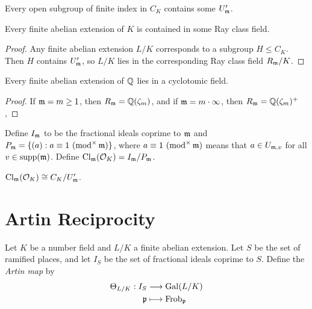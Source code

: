 \begin{lemma}
  Every open subgroup of finite index
  in $C_K$ contains some $U_{\mathfrak{m}}'$.
\end{lemma}

\begin{corollary}
  Every finite abelian extension of
  $K$ is contained in some Ray
  class field.
\end{corollary}

\begin{proof}
  Any finite abelian extension $L / K$
  corresponds to a subgroup $H \le C_K$.
  Then $H$ contains $U_{\mathfrak{m}}'$, so
  $L / K$ lies in the corresponding
  Ray class field $R_{\mathfrak{m}} / K$.
\end{proof}

\begin{corollary}
  Every finite abelian extension of $\mathbb{Q}$
  lies in a cyclotomic field.
\end{corollary}

\begin{proof}
  If $\mathfrak{m} = m \ge 1$, then
  $R_{\mathfrak{m}} = \mathbb{Q}(\zeta_m)$, and if
  $\mathfrak{m} = m \cdot \infty$, then
  $R_{\mathfrak{m}} = \mathbb{Q}(\zeta_m)^+$,
\end{proof}

\begin{definition}
  Define $I_{\mathfrak{m}}$ to be the fractional
  ideals coprime to $\mathfrak{m}$ and
  $P_{\mathfrak{m}} = \{(a) : a \equiv 1 \ ({\mathrm{mod}^\times}\, \mathfrak{m})\}$,
  where $a \equiv 1 \ ({\mathrm{mod}^\times}\, \mathfrak{m})$ means
  that $a \in U_{\mathfrak{m}, v}$ for all $v \in \operatorname{supp}(\mathfrak{m})$.
  Define $\operatorname{Cl}_{\mathfrak{m}}(\mathcal{O}_K) = I_{\mathfrak{m}} / P_{\mathfrak{m}}$.
\end{definition}

\begin{prop}
  $\operatorname{Cl}_{\mathfrak{m}}(\mathcal{O}_K) \cong C_K / U_{\mathfrak{m}}'$.
\end{prop}

\section{Artin Reciprocity}

\begin{definition}
  Let $K$ be a number field and $L / K$
  a finite abelian extension. Let
  $S$ be the set of ramified places, and
  let $I_S$ be the set of fractional ideals
  coprime to $S$. Define the \emph{Artin map}
  by
  \begin{align*}
    \Theta_{L / K} : I_S
    &\longrightarrow \operatorname{Gal}(L / K) \\
    \mathfrak{p} &\longmapsto
    \operatorname{Frob}_{\mathfrak{p}}
  \end{align*}
\end{definition}

